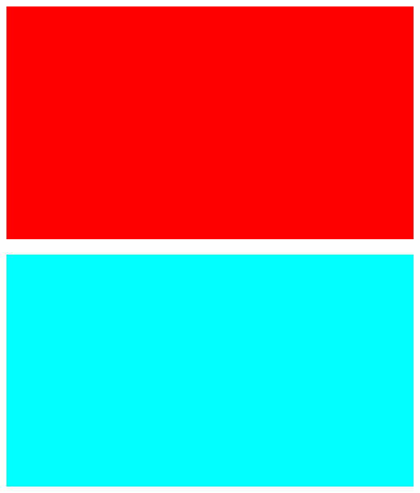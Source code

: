 \documentclass{article}
\begin{document}
\includegraphics[width=1\textwidth]{media/image13.png}

\includegraphics[width=1\textwidth]{media/image14.png}
\end{document}
